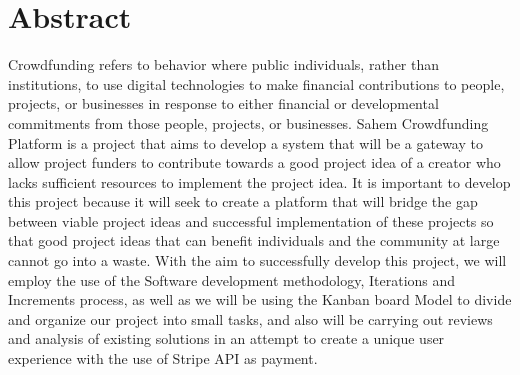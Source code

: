\cleardoublepage%
\chapter*{Abstract}
\thispagestyle{empty}

Crowdfunding refers to behavior where public individuals, rather than institutions, to use digital
technologies to make financial contributions to people, projects, or businesses in response to
either financial or developmental commitments from those people, projects, or businesses.
Sahem Crowdfunding Platform is a project that aims to develop a system that will be a gateway to allow project funders to
contribute towards a good project idea of a creator who lacks sufficient resources to implement
the project idea. It is important to develop this project because it will seek to create a platform
that will bridge the gap between viable project ideas and successful implementation of these
projects so that good project ideas that can benefit individuals and the community at large cannot
go into a waste.
With the aim to successfully develop this project, we will employ the use of the Software
development methodology, Iterations and Increments process, as well as we will be using the Kanban board Model
to divide and organize our project into small tasks, and also will be carrying out reviews and analysis of existing solutions in an attempt to
create a unique user experience with the use of Stripe API as payment.
